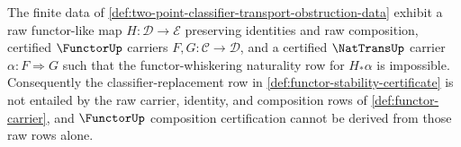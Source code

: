 \begin{theorem}
\label{thm:functorup-composition-obstruction-without-classifier-replacement}
The finite data of \autoref{def:two-point-classifier-transport-obstruction-data} exhibit a raw functor-like map $H:\mathcal D\to\mathcal E$ preserving identities and raw composition, certified $\FunctorUp$ carriers $F,G:\mathcal C\to\mathcal D$, and a certified $\NatTransUp$ carrier $\alpha:F\Rightarrow G$ such that the functor-whiskering naturality row for $H_{\ast}\alpha$ is impossible. Consequently the classifier-replacement row in \autoref{def:functor-stability-certificate} is not entailed by the raw carrier, identity, and composition rows of \autoref{def:functor-carrier}, and $\FunctorUp$ composition certification cannot be derived from those raw rows alone.
\end{theorem}
